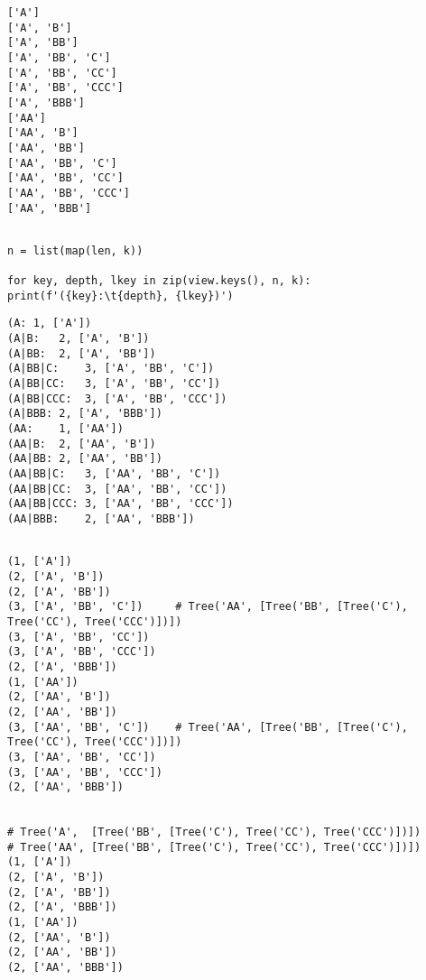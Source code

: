 \documentclass[10pt]{amsart}
\numberwithin{equation}{section}
\begin{document}
\begin{verbatim}
['A']
['A', 'B']
['A', 'BB']
['A', 'BB', 'C']
['A', 'BB', 'CC']
['A', 'BB', 'CCC']
['A', 'BBB']
['AA']
['AA', 'B']
['AA', 'BB']
['AA', 'BB', 'C']
['AA', 'BB', 'CC']
['AA', 'BB', 'CCC']
['AA', 'BBB']


\end{verbatim}


\begin{verbatim}
n = list(map(len, k))

for key, depth, lkey in zip(view.keys(), n, k): print(f'({key}:\t{depth}, {lkey})')
\end{verbatim}

\begin{verbatim}
(A:	1, ['A'])
(A|B:	2, ['A', 'B'])
(A|BB:	2, ['A', 'BB'])
(A|BB|C:	3, ['A', 'BB', 'C'])
(A|BB|CC:	3, ['A', 'BB', 'CC'])
(A|BB|CCC:	3, ['A', 'BB', 'CCC'])
(A|BBB:	2, ['A', 'BBB'])
(AA:	1, ['AA'])
(AA|B:	2, ['AA', 'B'])
(AA|BB:	2, ['AA', 'BB'])
(AA|BB|C:	3, ['AA', 'BB', 'C'])
(AA|BB|CC:	3, ['AA', 'BB', 'CC'])
(AA|BB|CCC:	3, ['AA', 'BB', 'CCC'])
(AA|BBB:	2, ['AA', 'BBB'])


\end{verbatim}

\begin{verbatim}
(1, ['A'])
(2, ['A', 'B'])
(2, ['A', 'BB'])
(3, ['A', 'BB', 'C'])     # Tree('AA', [Tree('BB', [Tree('C'), Tree('CC'), Tree('CCC')])])
(3, ['A', 'BB', 'CC'])
(3, ['A', 'BB', 'CCC'])
(2, ['A', 'BBB'])
(1, ['AA'])
(2, ['AA', 'B'])
(2, ['AA', 'BB'])
(3, ['AA', 'BB', 'C'])    # Tree('AA', [Tree('BB', [Tree('C'), Tree('CC'), Tree('CCC')])])
(3, ['AA', 'BB', 'CC'])
(3, ['AA', 'BB', 'CCC'])
(2, ['AA', 'BBB'])


# Tree('A',  [Tree('BB', [Tree('C'), Tree('CC'), Tree('CCC')])])
# Tree('AA', [Tree('BB', [Tree('C'), Tree('CC'), Tree('CCC')])])
(1, ['A'])
(2, ['A', 'B'])
(2, ['A', 'BB'])
(2, ['A', 'BBB'])
(1, ['AA'])
(2, ['AA', 'B'])
(2, ['AA', 'BB'])
(2, ['AA', 'BBB'])

\end{verbatim}
\end{document}
